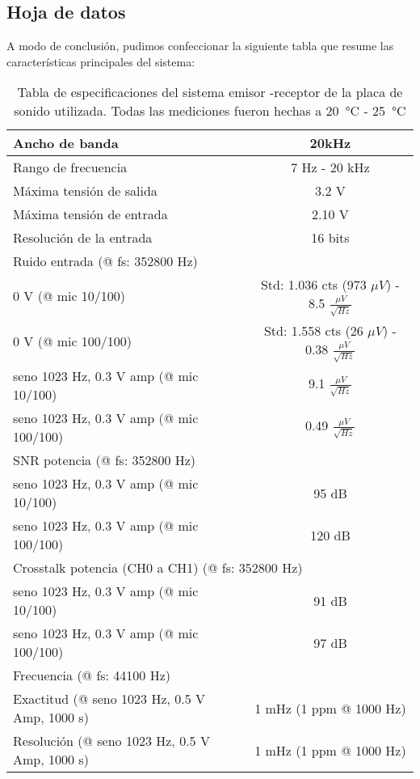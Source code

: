 \documentclass[a4paper, 11pt]{article}
\begin{document}
\subsection*{Hoja de datos}
A modo de conclusión, pudimos confeccionar la siguiente tabla que resume las características principales del sistema:
\begin {table}[H]
\begin {center}
 \begin{tabular} {|l|c|}
        \hline
        Ancho de banda & 20kHz \\
        \hline
        Rango de frecuencia & 7 Hz - 20 kHz\\
        \hline
        Máxima tensión de salida  & 3.2 V\\
        \hline
        Máxima tensión de entrada  & 2.10 V\\
        \hline
        Resolución de la entrada  & 16 bits\\
        \hline
	\multicolumn{2}{|l|}{Ruido entrada (@ fs: 352800 Hz)} \tabularnewline
        \hline
        0 V (@ mic 10/100) & Std: 1.036 cts (973 $\mu V$)  - 8.5 $ \frac{\mu V}{\sqrt{Hz}}$ \\
        0 V (@ mic 100/100) & Std: 1.558 cts (26 $\mu V$) - 0.38 $ \frac{\mu V}{\sqrt{Hz}}$ \\
        \hline
         seno 1023 Hz, 0.3 V amp (@ mic 10/100) & 9.1 $ \frac{\mu V}{\sqrt{Hz}}$\\
	seno 1023 Hz, 0.3 V amp (@ mic 100/100) & 0.49 $ \frac{\mu V}{\sqrt{Hz}}$\\
        \hline
	\multicolumn{2}{|l|}{SNR potencia (@ fs: 352800 Hz)} \tabularnewline
        \hline
         seno 1023 Hz, 0.3 V amp (@ mic 10/100) & 95 dB \\
	seno 1023 Hz, 0.3 V amp (@ mic 100/100) & 120 dB \\
	\hline
	\multicolumn{2}{|l|}{Crosstalk potencia (CH0 a CH1) (@ fs: 352800 Hz)} \tabularnewline
	\hline
        seno 1023 Hz, 0.3 V amp (@ mic 10/100) & 91 dB \\
	seno 1023 Hz, 0.3 V amp (@ mic 100/100) & 97 dB \\
        \hline
\multicolumn{2}{|l|}{Frecuencia (@ fs: 44100 Hz) } \tabularnewline
        \hline
	Exactitud (@ seno 1023 Hz, 0.5 V Amp, 1000 s)  & 1 mHz (1 ppm @ 1000 Hz) \\
	Resolución (@ seno 1023 Hz, 0.5 V Amp, 1000 s) & 1 mHz (1 ppm @ 1000 Hz) \\
        \hline
 \end{tabular}
 \caption{Tabla de especificaciones del sistema emisor -receptor de la placa de sonido utilizada. Todas las mediciones fueron hechas a \SI{20}{\celsius} - \SI{25}{\celsius}}
 \label{table1}
 \end{center}
\end{table}
\end{document}
